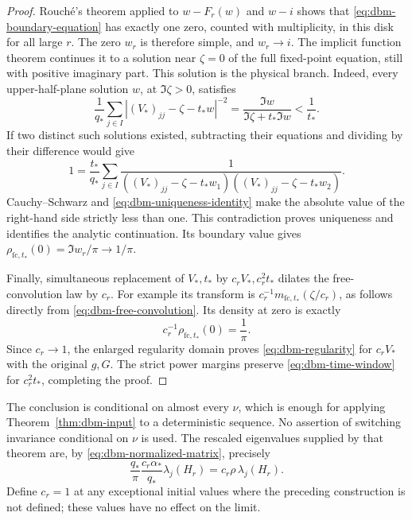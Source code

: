 \begin{proof}
Rouch\'e's theorem applied to \(w-F_r(w)\) and \(w-i\) shows that
\eqref{eq:dbm-boundary-equation} has exactly one zero, counted with
multiplicity, in this disk for all large \(r\). The zero \(w_r\) is
therefore simple, and \(w_r\to i\).
The implicit function theorem continues it to a solution near
\(\zeta=0\) of the full fixed-point equation, still with positive
imaginary part. This solution is the physical branch. Indeed, every
upper-half-plane solution \(w\), at \(\Im\zeta>0\), satisfies
\begin{equation}
 \label{eq:dbm-uniqueness-identity}
 \frac1{q_*}\sum_{j\in I}
   |(V_*)_{jj}-\zeta-t_*w|^{-2}
       =\frac{\Im w}{\Im\zeta+t_*\Im w}<\frac1{t_*}.
\end{equation}
If two distinct such solutions existed, subtracting their equations
and dividing by their difference would give
\[
 1=\frac{t_*}{q_*}\sum_{j\in I}
  \frac1{((V_*)_{jj}-\zeta-t_*w_1)
          ((V_*)_{jj}-\zeta-t_*w_2)}.
\]
Cauchy--Schwarz and \eqref{eq:dbm-uniqueness-identity} make the
absolute value of the right-hand side strictly less than one.
This contradiction proves uniqueness and identifies the analytic
continuation. Its boundary value gives
\(\rho_{\mathrm{fc},t_*}(0)=\Im w_r/\pi\to1/\pi\).

Finally, simultaneous replacement of \(V_*,t_*\) by
\(c_rV_*,c_r^2t_*\) dilates the free-convolution law by \(c_r\).
For example its transform is
\(c_r^{-1}m_{\mathrm{fc},t_*}(\zeta/c_r)\), as follows directly
from \eqref{eq:dbm-free-convolution}. Its density at zero is exactly
\[
 c_r^{-1}\rho_{\mathrm{fc},t_*}(0)=\frac1\pi.
\]
Since \(c_r\to1\), the enlarged regularity domain proves
\eqref{eq:dbm-regularity} for \(c_rV_*\) with the original \(g,G\).
The strict power margins preserve \eqref{eq:dbm-time-window} for
\(c_r^2t_*\), completing the proof.
\end{proof}

The conclusion is conditional on almost every \(\nu\), which is
enough for applying Theorem~\ref{thm:dbm-input} to a deterministic
sequence. No assertion of switching invariance conditional on \(\nu\)
is used. The rescaled eigenvalues supplied by that theorem are, by
\eqref{eq:dbm-normalized-matrix}, precisely
\begin{equation}
 \label{eq:dbm-final-coordinates}
 \frac{q_*}{\pi}\frac{c_r\alpha_*}{q_*}
       \lambda_j(H_r)
       =c_r\rho\,\lambda_j(H_r).
\end{equation}
Define \(c_r=1\) at any exceptional initial values where the preceding
construction is not defined; these values have no effect on the limit.

